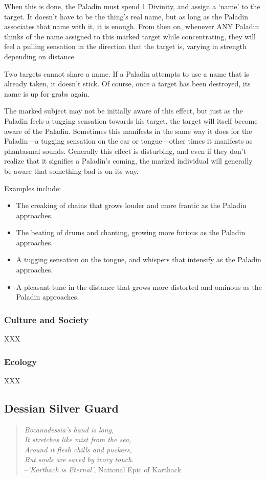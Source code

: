 \documentclass[oneside,11pt,english]{book}
\begin{document}
When this is done, the Paladin must spend 1 Divinity, and assign a ‘name’ to the target. It doesn't have to be the thing's real name, but as long as the Paladin associates that name with it, it is enough. From then on, whenever ANY Paladin thinks of the name assigned to this marked target while concentrating, they will feel a pulling sensation in the direction that the target is, varying in strength depending on distance.


Two targets cannot share a name. If a Paladin attempts to use a name that is already taken, it doesn't stick. Of course, once a target has been destroyed, its name is up for grabs again.


The marked subject may not be initially aware of this effect, but just as the Paladin feels a tugging sensation towards his target, the target will itself become aware of the Paladin.
Sometimes this manifests in the same way it does for the Paladin—a tugging sensation on the ear or tongue—other times it manifests as phantasmal sounds.
Generally this effect is disturbing, and even if they don't realize that it signifies a Paladin's coming, the marked individual will generally be aware that something bad is on its way. 


Examples include:
\begin{itemize}
\item The creaking of chains that grows louder and more frantic as the Paladin approaches. 
\item The beating of drums and chanting, growing more furious as the Paladin approaches. 
\item A tugging sensation on the tongue, and whispers that intensify as the Paladin approaches. 
\item A pleasant tune in the distance that grows more distorted and ominous as the Paladin 
approaches. 
\end{itemize}
\subsubsection*{Culture and Society} 
XXX 
\subsubsection*{Ecology} 
XXX 
\subsection{Dessian Silver Guard}\label{sec:dessian-silver-guard}
\begin{verse}
	\emph{Bocanadessia's hand is long,\\
It stretches like mist from the sea,\\
Around it flesh chills and puckers,\\
But souls are saved by ivory touch.}\\

--\textit{‘Karthack is Eternal’}, National Epic of Karthack
\end{verse}
\end{document}
